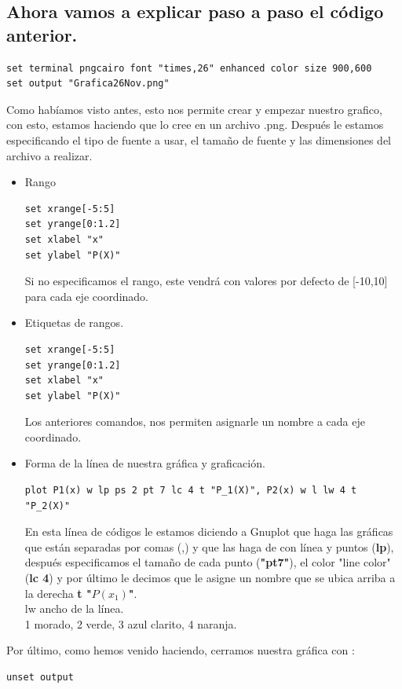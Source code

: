 \documentclass[onecolumn]{article} %
\begin{document}
\subsection{Ahora vamos a explicar paso a paso el código anterior.}
\begin{verbatim}
set terminal pngcairo font "times,26" enhanced color size 900,600
set output "Grafica26Nov.png"
\end{verbatim}
Como habíamos visto antes, esto nos permite crear y empezar nuestro grafico, con esto, estamos haciendo que lo cree en un archivo .png. Después le estamos especificando el tipo de fuente a usar, el tamaño de fuente y las dimensiones del archivo a realizar.\\
\begin{itemize}
    \item Rango
    \begin{verbatim}
set xrange[-5:5]
set yrange[0:1.2]
set xlabel "x"
set ylabel "P(X)"
	\end{verbatim}
Si no especificamos el rango, este vendrá con valores por defecto de [-10,10] para cada eje coordinado.
    \item Etiquetas de rangos.
\begin{verbatim}
set xrange[-5:5]
set yrange[0:1.2]
set xlabel "x"
set ylabel "P(X)"
\end{verbatim}
Los anteriores comandos, nos permiten asignarle un nombre a cada eje coordinado.
   \item Forma de la línea de nuestra gráfica y graficación.
  \begin{verbatim}
plot P1(x) w lp ps 2 pt 7 lc 4 t "P_1(X)", P2(x) w l lw 4 t "P_2(X)" 
  \end{verbatim}
 En esta línea de códigos le estamos diciendo a Gnuplot que haga las gráficas que están separadas por comas (,) y que las haga de con línea y puntos (\textbf{lp}), después especificamos el tamaño de cada punto (\textbf{"pt7"}), el color "line color" (\textbf{lc 4}) y por último le decimos que le asigne un nombre que se ubica arriba a la derecha \textbf{t "$P(x_1)$"}.\\
lw ancho de la línea.\\
1 morado, 2 verde, 3 azul clarito, 4 naranja.
\end{itemize}
Por último, como hemos venido haciendo, cerramos nuestra gráfica con :
\begin{verbatim}
unset output
\end{verbatim}
\end{document}

